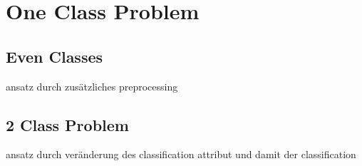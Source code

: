 \section{One Class Problem}
\label{ocp}



\subsection{Even Classes}
\label{even}
ansatz durch zusätzliches preprocessing




\subsection{2 Class Problem}
\label{2class}
ansatz durch veränderung des classification attribut und damit der classification
